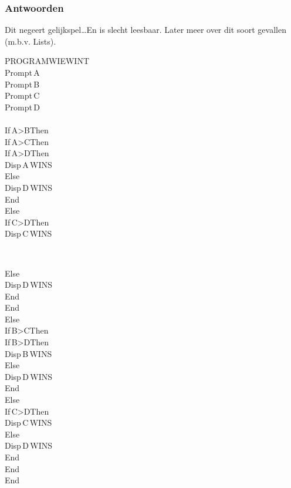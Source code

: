 \begin{frame}
\frametitle{Antwoorden}

\begin{minipage}{0.48\textwidth}
Dit negeert gelijkspel\ldots En is slecht leesbaar.
Later meer over dit soort gevallen (m.b.v. Lists).

\vspace{0.2cm}
\begin{ticalc}
	PROGRAM\:WIEWINT\\%
	\:Prompt\,A\\%
	\:Prompt\,B\\%
	\:Prompt\,C\\%
	\:Prompt\,D\\%
	\:\\%
	\:If\,A>B\:Then\\%
		\:If\,A>C\:Then\\%
			\:If\,A>D\:Then\\%
				\:Disp\,\qt A\,WINS\qt\\%
			\:Else\\%
				\:Disp\,\qt D\,WINS\qt\\%
			\:End\\%
		\:Else\\%
			\:If\,C>D\:Then\\%
				\:Disp\,\qt C\,WINS\qt\\%
\end{ticalc}
\end{minipage}
~
\begin{minipage}{0.48\textwidth}
\begin{ticalc}	
			\:Else\\%
				\:Disp\,\qt D\,WINS\qt\\%
			\:End\\%
		\:End\\%
	\:Else\\%
		\:If\,B>C\:Then\\%
			\:If\,B>D\:Then\\%
				\:Disp\,\qt B\,WINS\qt\\%
			\:Else\\%
				\:Disp\,\qt D\,WINS\qt\\%
			\:End\\%
		\:Else\\%
			\:If\,C>D\:Then\\%
				\:Disp\,\qt C\,WINS\qt\\%
			\:Else\\%
				\:Disp\,\qt D\,WINS\qt\\%
			\:End\\%
		\:End\\%
	\:End
\end{ticalc}
\end{minipage}

\end{frame}





